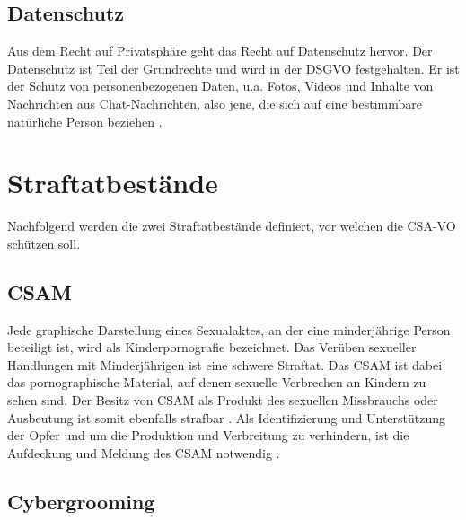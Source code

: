 \subsection*{Datenschutz}
\label{subsec:Grundlagen:DefDatenschutz}

Aus dem Recht auf Privatsphäre geht das Recht auf Datenschutz hervor. Der Datenschutz ist Teil der Grundrechte und wird in der \ac{DSGVO} festgehalten. Er ist der Schutz von personenbezogenen Daten, u.a. Fotos, Videos und Inhalte von Nachrichten aus Chat-Nachrichten, also jene, die sich auf eine bestimmbare natürliche Person beziehen \cite{edps:datenschutz, eu_charta_der_grundrechte}.


\section{Straftatbestände}
\label{sec:Grundlagen:DefStraftaten}
Nachfolgend werden die zwei Straftatbestände definiert, vor welchen die \ac{CSA-VO} schützen soll.

\subsection*{CSAM}
\label{subsec:Grundlagen:DefCSAM}

Jede graphische Darstellung eines Sexualaktes, an der eine minderjährige Person beteiligt ist, wird als Kinderpornografie bezeichnet. Das Verüben sexueller Handlungen mit Minderjährigen ist eine schwere Straftat. Das \ac{CSAM} ist dabei das pornographische Material, auf denen sexuelle Verbrechen an Kindern zu sehen sind. Der Besitz von \ac{CSAM} als Produkt des sexuellen Missbrauchs oder Ausbeutung ist somit ebenfalls strafbar \cite{abelson:2024, ncmec:csam}. Als Identifizierung und Unterstützung der Opfer und um die Produktion und Verbreitung zu verhindern, ist die Aufdeckung und Meldung des \ac{CSAM} notwendig \cite{csa_verordnung}.

\subsection*{Cybergrooming}
\label{subsec:Grundlagen:DefGrooming}

